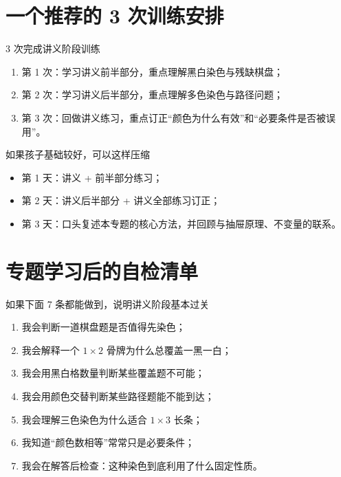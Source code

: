 \documentclass[11pt,a4paper,fontset=fandol]{ctexart}
\begin{document}
\section{一个推荐的 3 次训练安排}

\begin{goalbox}{3 次完成讲义阶段训练}
\begin{enumerate}
  \item 第 1 次：学习讲义前半部分，重点理解黑白染色与残缺棋盘；
  \item 第 2 次：学习讲义后半部分，重点理解多色染色与路径问题；
  \item 第 3 次：回做讲义练习，重点订正“颜色为什么有效”和“必要条件是否被误用”。
\end{enumerate}
\end{goalbox}

\begin{infobox}{如果孩子基础较好，可以这样压缩}
\begin{itemize}
  \item 第 1 天：讲义 + 前半部分练习；
  \item 第 2 天：讲义后半部分 + 讲义全部练习订正；
  \item 第 3 天：口头复述本专题的核心方法，并回顾与抽屉原理、不变量的联系。
\end{itemize}
\end{infobox}

\section{专题学习后的自检清单}

\begin{goalbox}{如果下面 7 条都能做到，说明讲义阶段基本过关}
\begin{enumerate}
  \item 我会判断一道棋盘题是否值得先染色；
  \item 我会解释一个 $1\times 2$ 骨牌为什么总覆盖一黑一白；
  \item 我会用黑白格数量判断某些覆盖题不可能；
  \item 我会用颜色交替判断某些路径题能不能到达；
  \item 我会理解三色染色为什么适合 $1\times 3$ 长条；
  \item 我知道“颜色数相等”常常只是必要条件；
  \item 我会在解答后检查：这种染色到底利用了什么固定性质。
\end{enumerate}
\end{goalbox}
\end{document}
